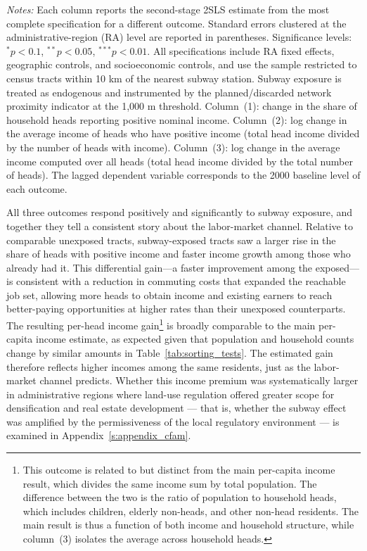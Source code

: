 \begin{table}[htbp]
\begin{tablenotes}
\item \textit{Notes:} Each column reports the second-stage 2SLS estimate from the most complete specification for a different outcome. Standard errors clustered at the administrative-region (RA) level are reported in parentheses. Significance levels: $^{*}p<0.1$, $^{**}p<0.05$, $^{***}p<0.01$. All specifications include RA fixed effects, geographic controls, and socioeconomic controls, and use the sample restricted to census tracts within 10 km of the nearest subway station. Subway exposure is treated as endogenous and instrumented by the planned/discarded network proximity indicator at the 1,000 m threshold. Column~(1): change in the share of household heads reporting positive nominal income. Column~(2): log change in the average income of heads who have positive income (total head income divided by the number of heads with income). Column~(3): log change in the average income computed over all heads (total head income divided by the total number of heads). The lagged dependent variable corresponds to the 2000 baseline level of each outcome.
\end{tablenotes}
\end{table}

All three outcomes respond positively and significantly to subway exposure, and together they tell a consistent story about the labor-market channel. Relative to comparable unexposed tracts, subway-exposed tracts saw a larger rise in the share of heads with positive income and faster income growth among those who already had it. This differential gain---a faster improvement among the exposed---is consistent with a reduction in commuting costs that expanded the reachable job set, allowing more heads to obtain income and existing earners to reach better-paying opportunities at higher rates than their unexposed counterparts. The resulting per-head income gain\footnote{This outcome is related to but distinct from the main per-capita income result, which divides the same income sum by total population. The difference between the two is the ratio of population to household heads, which includes children, elderly non-heads, and other non-head residents. The main result is thus a function of both income and household structure, while column~(3) isolates the average across household heads.} is broadly comparable to the main per-capita income estimate, as expected given that population and household counts change by similar amounts in Table~\ref{tab:sorting_tests}. The estimated gain therefore reflects higher incomes among the same residents, just as the labor-market channel predicts. Whether this income premium was systematically larger in administrative regions where land-use regulation offered greater scope for densification and real estate development --- that is, whether the subway effect was amplified by the permissiveness of the local regulatory environment --- is examined in Appendix~\ref{s:appendix_cfam}.